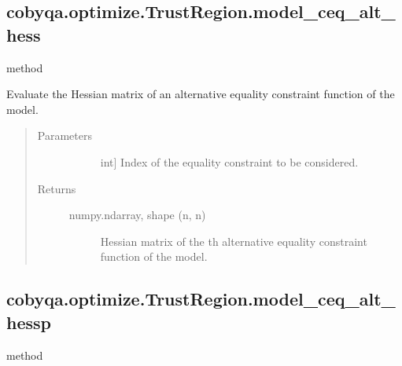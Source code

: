 \documentclass[letterpaper,10pt,english]{sphinxmanual}
\begin{document}
\begin{fulllineitems}
\begin{fulllineitems}
\end{fulllineitems}



\subsection{cobyqa.optimize.TrustRegion.model\_ceq\_alt\_hess}
\label{\detokenize{refs/generated/cobyqa.optimize.TrustRegion.model_ceq_alt_hess:cobyqa-optimize-trustregion-model-ceq-alt-hess}}\label{\detokenize{refs/generated/cobyqa.optimize.TrustRegion.model_ceq_alt_hess::doc}}
\sphinxAtStartPar
method

\begin{fulllineitems}
\label{\detokenize{refs/generated/cobyqa.optimize.TrustRegion.model_ceq_alt_hess:cobyqa.optimize.TrustRegion.model_ceq_alt_hess}}
\sphinxAtStartPar
Evaluate the Hessian matrix of an alternative equality constraint
function of the model.
\begin{quote}\begin{description}
\item[{Parameters}] \leavevmode\begin{description}
\item[{}] \leavevmode{[}int{]}
\sphinxAtStartPar
Index of the equality constraint to be considered.

\end{description}

\item[{Returns}] \leavevmode\begin{description}
\item[{numpy.ndarray, shape (n, n)}] \leavevmode
\sphinxAtStartPar
Hessian matrix of the \sphinxhyphen{}th alternative equality constraint
function of the model.

\end{description}

\end{description}\end{quote}

\end{fulllineitems}



\subsection{cobyqa.optimize.TrustRegion.model\_ceq\_alt\_hessp}
\label{\detokenize{refs/generated/cobyqa.optimize.TrustRegion.model_ceq_alt_hessp:cobyqa-optimize-trustregion-model-ceq-alt-hessp}}\label{\detokenize{refs/generated/cobyqa.optimize.TrustRegion.model_ceq_alt_hessp::doc}}
\sphinxAtStartPar
method


\end{fulllineitems}
\end{document}
